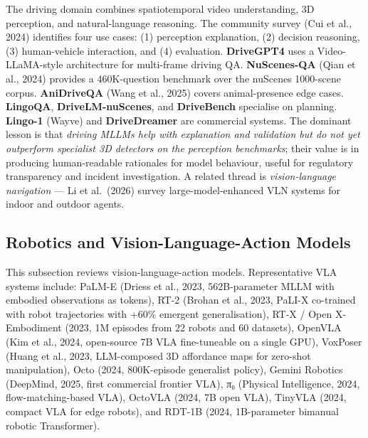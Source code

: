 The driving domain combines spatiotemporal video understanding, 3D perception, and natural-language reasoning. The community survey (Cui et al., 2024) identifies four use cases: (1) perception explanation, (2) decision reasoning, (3) human-vehicle interaction, and (4) evaluation. \textbf{DriveGPT4} uses a Video-LLaMA-style architecture for multi-frame driving QA. \textbf{NuScenes-QA} (Qian et al., 2024) provides a 460K-question benchmark over the nuScenes 1000-scene corpus. \textbf{AniDriveQA} (Wang et al., 2025) covers animal-presence edge cases. \textbf{LingoQA}, \textbf{DriveLM-nuScenes}, and \textbf{DriveBench} specialise on planning. \textbf{Lingo-1} (Wayve) and \textbf{DriveDreamer} are commercial systems. The dominant lesson is that \emph{driving MLLMs help with explanation and validation but do not yet outperform specialist 3D detectors on the perception benchmarks}; their value is in producing human-readable rationales for model behaviour, useful for regulatory transparency and incident investigation. A related thread is \emph{vision-language navigation} --- Li et al.~(2026) survey large-model-enhanced VLN systems for indoor and outdoor agents.

\subsection{Robotics and Vision-Language-Action Models}\label{robotics-and-vision-language-action-models}

This subsection reviews vision-language-action models. Representative VLA systems include: PaLM-E (Driess et al., 2023, 562B-parameter MLLM with embodied observations as tokens), RT-2 (Brohan et al., 2023, PaLI-X co-trained with robot trajectories with +60\% emergent generalisation), RT-X / Open X-Embodiment (2023, 1M episodes from 22 robots and 60 datasets), OpenVLA (Kim et al., 2024, open-source 7B VLA fine-tuneable on a single GPU), VoxPoser (Huang et al., 2023, LLM-composed 3D affordance maps for zero-shot manipulation), Octo (2024, 800K-episode generalist policy), Gemini Robotics (DeepMind, 2025, first commercial frontier VLA), π₀ (Physical Intelligence, 2024, flow-matching-based VLA), OctoVLA (2024, 7B open VLA), TinyVLA (2024, compact VLA for edge robots), and RDT-1B (2024, 1B-parameter bimanual robotic Transformer).

